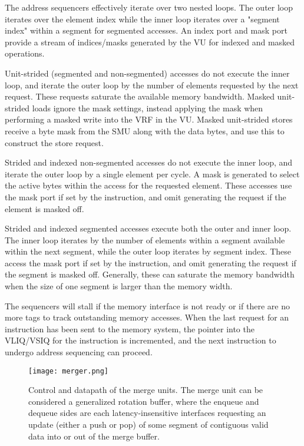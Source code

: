 The address sequencers effectively iterate over two nested loops.
The outer loop iterates over the element index while the inner loop iterates over a "segment index" within a segment for segmented accesses.
An index port and mask port provide a stream of indices/masks generated by the VU for indexed and masked operations.

Unit-strided (segmented and non-segmented) accesses do not execute the inner loop, and iterate the outer loop by the number of elements requested by the next request.
These requests saturate the available memory bandwidth.
Masked unit-strided loads ignore the mask settings, instead applying the mask when performing a masked write into the VRF in the VU.
Masked unit-strided stores receive a byte mask from the SMU along with the data bytes, and use this to construct the store request.

Strided and indexed non-segmented accesses do not execute the inner loop, and iterate the outer loop by a single element per cycle.
A mask is generated to select the active bytes within the access for the requested element.
These accesses use the mask port if set by the instruction, and omit generating the request if the element is masked off.

Strided and indexed segmented accesses execute both the outer and inner loop.
The inner loop iterates by the number of elements within a segment available within the next segment, while the outer loop iterates by segment index.
These access the mask port if set by the instruction, and omit generating the request if the segment is masked off.
Generally, these can saturate the memory bandwidth when the size of one segment is larger than the memory width.

The sequencers will stall if the memory interface is not ready or if there are no more tags to track outstanding memory accesses.
When the last request for an instruction has been sent to the memory system, the pointer into the VLIQ/VSIQ for the instruction is incremented, and the next instruction to undergo address sequencing can proceed.

\newpage
\begin{figure}[hbtp]
  \centering
  \texttt{[image: merger.png]}
  \caption{Control and datapath of the merge units. The merge unit can be considered a generalized rotation buffer, where the enqueue and dequeue sides are each latency-insensitive interfaces requesting an update (either a push or pop) of some segment of contiguous valid data into or out of the merge buffer.}
  \label{fig:merge}
\end{figure}

